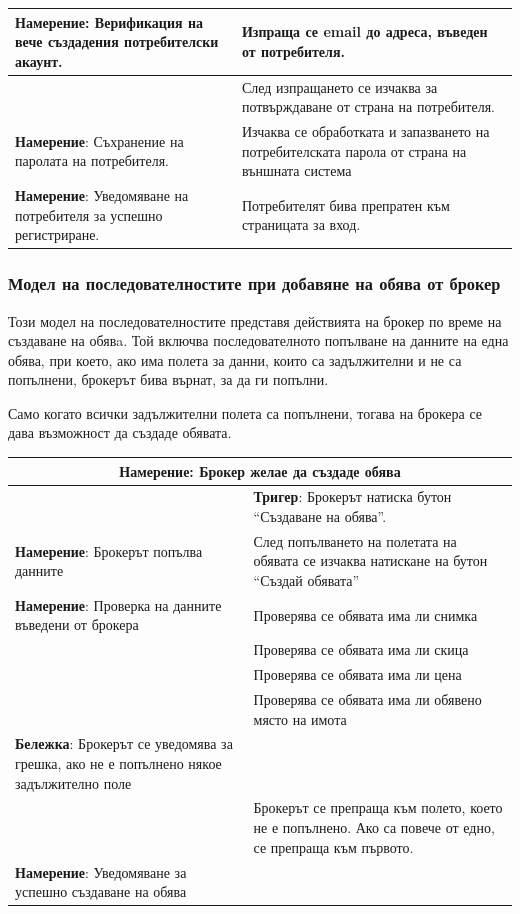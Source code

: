 \documentclass[a4paper]{article}
\begin{document}
\begin{center}
\begin{tabular}{ |p{5cm}|p{10cm}| }
    \hline
    \textbf{Намерение}:  Верификация на вече създадения потребителски акаунт. & Изпраща се email до адреса, въведен от потребителя.  \\
    \hline
     & След изпращането се изчаква за потвърждаване от страна на потребителя. \\
    \hline
    \textbf{Намерение}: Съхранение на паролата на потребителя. & Изчаква се обработката и запазването на потребителската парола от страна на външната система\\
    \hline
    \textbf{Намерение}: Уведомяване на потребителя за успешно регистриране. & Потребителят бива препратен към страницата за вход. \\
    \hline
  \end{tabular}
\end{center}

	
\subsubsection{Модел на последователностите при добавяне на обява от брокер}		

Този модел на последователностите представя действията на брокер по време на създаване на обявa. Той включва последователното попълване на данните на една обява, при което, ако има полета за данни, които са задължителни и не са попълнени, брокерът бива върнат, за да ги попълни.

Само когато всички задължителни полета са попълнени, тогава на брокера се дава възможност да създаде обявата.

\begin{center}
  \begin{tabular}{ |p{5cm}|p{10cm}| }
    \hline
    \multicolumn{2}{|c|}{\textbf{Намерение}: Брокер желае да създаде обява} \\
    \hline
    	& \textbf{Тригер}: Брокерът натиска бутон ``Създаване на обява''. \\
    \hline
    	\textbf{Намерение}: Брокерът попълва данните & След попълването на полетата на обявата се изчаква натискане на бутон ``Създай обявата''  \\  
	\hline
    	\textbf{Намерение}: Проверка на данните въведени от брокера & Проверява се обявата има ли снимка \\
    \hline
    	& Проверява се обявата има ли скица \\
    \hline
    	& Проверява се обявата има ли цена \\
    \hline
    	& Проверява се обявата има ли обявено място на имота \\
    \hline
        \textbf{Бележка}: Брокерът се уведомява за грешка, ако не е попълнено някое задължително поле & \\
    \hline     
    	& Брокерът се препраща към полето, което не е попълнено. Ако са повече от едно, се препраща към първото. \\
    \hline
    	\textbf{Намерение}: Уведомяване за успешно създаване на обява & \\
    \hline
  \end{tabular}
\end{center}
\end{document}
